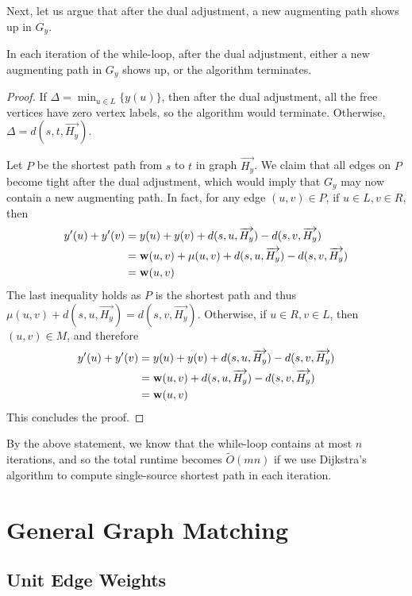 Next, let us argue that after the dual adjustment, a new augmenting path shows up in $G_y$.

\begin{lemma}
	In each iteration of the while-loop, after the dual adjustment, either a new augmenting path in $G_y$ shows up, or the algorithm terminates.
\end{lemma}
\begin{proof}
	If $\Delta = \min_{u\in L}\{y(u)\}$, then after the dual adjustment, all the free vertices have zero vertex labels, so the algorithm would terminate. Otherwise, $\Delta =  d(s, t, \overrightarrow{H_y})$.
	
	Let $P$ be the shortest path from $s$ to $t$ in graph $\overrightarrow{H_y}$. We claim that all edges on $P$ become tight after the dual adjustment, which would imply that $G_y$ may now contain a new augmenting path. In fact, for any edge $(u, v)\in P$, if $u\in L, v\in R$, then 
	$$\begin{aligned}
		y'(u) + y'(v) &= y(u) + y(v) + d(s, u, \overrightarrow{H_y}) - d(s, v, \overrightarrow{H_y})\\
		&= \mathbf{w}(u, v) + \mu(u, v) + d(s, u, \overrightarrow{H_y}) - d(s, v, \overrightarrow{H_y}) \\
		&=\mathbf{w}(u, v)
	\end{aligned}$$
	The last inequality holds as $P$ is the shortest path and thus $\mu(u, v) + d(s, u, \overrightarrow{H_y}) = d(s, v, \overrightarrow{H_y})$. Otherwise, if $u\in R, v\in L$, then $(u, v)\in M$, and therefore
	$$\begin{aligned}
		y'(u) + y'(v) &= y(u) + y(v) + d(s, u, \overrightarrow{H_y}) - d(s, v, \overrightarrow{H_y})\\
		&= \mathbf{w}(u, v) +d(s, u, \overrightarrow{H_y}) - d(s, v, \overrightarrow{H_y})\\
		&= \mathbf{w}(u, v)
	\end{aligned}$$
	This concludes the proof.
\end{proof}

By the above statement, we know that the while-loop contains at most $n$ iterations, and so the total runtime becomes $\tilde{O}(mn)$ if we use Dijkstra's algorithm to compute single-source shortest path in each iteration.

\section{General Graph Matching}

\subsection{Unit Edge Weights}

